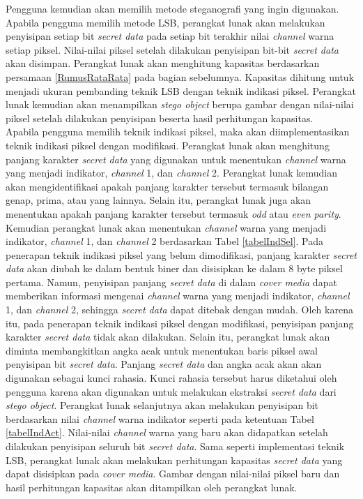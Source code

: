 \documentclass[a4paper,twoside]{article}
\begin{document}
\begin{enumerate}
		Pengguna kemudian akan memilih metode steganografi yang ingin digunakan. Apabila pengguna memilih metode LSB, perangkat lunak akan melakukan penyisipan setiap bit \textit{secret data} pada setiap bit terakhir nilai \textit{channel} warna setiap piksel. Nilai-nilai piksel setelah dilakukan penyisipan bit-bit \textit{secret data} akan disimpan. Perangkat lunak akan menghitung kapasitas berdasarkan persamaan \ref{RumusRataRata} pada bagian sebelumnya. Kapasitas dihitung untuk menjadi ukuran pembanding teknik LSB dengan teknik indikasi piksel. Perangkat lunak kemudian akan menampilkan \textit{stego object} berupa gambar dengan nilai-nilai piksel setelah dilakukan penyisipan beserta hasil perhitungan kapasitas.\\
		Apabila pengguna memilih teknik indikasi piksel, maka akan diimplementasikan teknik indikasi piksel dengan modifikasi. Perangkat lunak akan menghitung panjang karakter \textit{secret data} yang digunakan untuk menentukan \textit{channel} warna yang menjadi indikator, \textit{channel} 1, dan \textit{channel} 2. Perangkat lunak kemudian akan mengidentifikasi apakah panjang karakter tersebut termasuk bilangan genap, prima, atau yang lainnya. Selain itu, perangkat lunak juga akan menentukan apakah panjang karakter tersebut termasuk \textit{odd} atau \textit{even parity}. Kemudian perangkat lunak akan menentukan \textit{channel} warna yang menjadi indikator, \textit{channel} 1, dan \textit{channel} 2 berdasarkan Tabel \ref{tabelIndSel}. Pada penerapan teknik indikasi piksel yang belum dimodifikasi, panjang karakter \textit{secret data} akan diubah ke dalam bentuk biner dan disisipkan ke dalam 8 byte piksel pertama. Namun, penyisipan panjang \textit{secret data} di dalam \textit{cover media} dapat memberikan informasi mengenai \textit{channel} warna yang menjadi indikator, \textit{channel} 1, dan \textit{channel} 2, sehingga \textit{secret data} dapat ditebak dengan mudah. Oleh karena itu, pada penerapan teknik indikasi piksel dengan modifikasi, penyisipan panjang karakter \textit{secret data} tidak akan dilakukan. Selain itu, perangkat lunak akan diminta membangkitkan angka acak untuk menentukan baris piksel awal penyisipan bit \textit{secret data}. Panjang \textit{secret data} dan angka acak akan akan digunakan sebagai kunci rahasia. Kunci rahasia tersebut harus diketahui oleh pengguna karena akan digunakan untuk melakukan ekstraksi \textit{secret data} dari \textit{stego object}. Perangkat lunak selanjutnya akan melakukan penyisipan bit berdasarkan nilai \textit{channel} warna indikator seperti pada ketentuan Tabel \ref{tabelIndAct}. Nilai-nilai \textit{channel} warna yang baru akan didapatkan setelah dilakukan penyisipan seluruh bit \textit{secret data}. Sama seperti implementasi teknik LSB, perangkat lunak akan melakukan perhitungan kapasitas \textit{secret data} yang dapat disisipkan pada \textit{cover media}. Gambar dengan nilai-nilai piksel baru dan hasil perhitungan kapasitas akan ditampilkan oleh perangkat lunak.\\
		

\end{enumerate}
\end{document}
